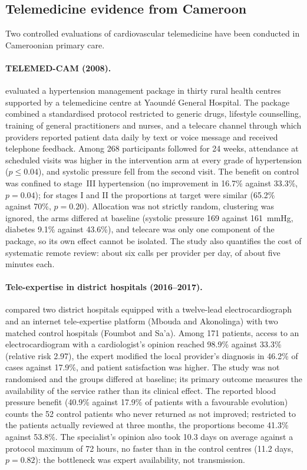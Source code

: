 \documentclass[12pt,a4paper,oneside]{report}
\begin{document}
\subsection{Telemedicine evidence from Cameroon}\label{sec:telemedcam}\label{sec:bediang}\label{sec:cameroon-joint}\label{sec:specialist-access}

Two controlled evaluations of cardiovascular telemedicine have been conducted in Cameroonian primary care.

\paragraph{TELEMED-CAM (2008).} \Textcite{kingue2013} evaluated a hypertension management package in thirty rural health centres supported by a telemedicine centre at Yaoundé General Hospital. The package combined a standardised protocol restricted to generic drugs, lifestyle counselling, training of general practitioners and nurses, and a telecare channel through which providers reported patient data daily by text or voice message and received telephone feedback. Among 268 participants followed for 24 weeks, attendance at scheduled visits was higher in the intervention arm at every grade of hypertension ($p \leq 0.04$), and systolic pressure fell from the second visit. The benefit on control was confined to stage~III hypertension (no improvement in 16.7\% against 33.3\%, $p = 0.04$); for stages I and II the proportions at target were similar (65.2\% against 70\%, $p = 0.20$). Allocation was not strictly random, clustering was ignored, the arms differed at baseline (systolic pressure 169 against 161~mmHg, diabetes 9.1\% against 43.6\%), and telecare was only one component of the package, so its own effect cannot be isolated. The study also quantifies the cost of systematic remote review: about six calls per provider per day, of about five minutes each.

\paragraph{Tele-expertise in district hospitals (2016--2017).} \Textcite{bediang2021} compared two district hospitals equipped with a twelve-lead electrocardiograph and an internet tele-expertise platform (Mbouda and Akonolinga) with two matched control hospitals (Foumbot and Sa'a). Among 171 patients, access to an electrocardiogram with a cardiologist's opinion reached 98.9\% against 33.3\% (relative risk 2.97), the expert modified the local provider's diagnosis in 46.2\% of cases against 17.9\%, and patient satisfaction was higher. The study was not randomised and the groups differed at baseline; its primary outcome measures the availability of the service rather than its clinical effect.\label{sec:bediang-appraisal} The reported blood pressure benefit (40.9\% against 17.9\% of patients with a favourable evolution) counts the 52 control patients who never returned as not improved; restricted to the patients actually reviewed at three months, the proportions become 41.3\% against 53.8\%. The specialist's opinion also took 10.3 days on average against a protocol maximum of 72 hours, no faster than in the control centres (11.2 days, $p = 0.82$): the bottleneck was expert availability, not transmission.
\end{document}
